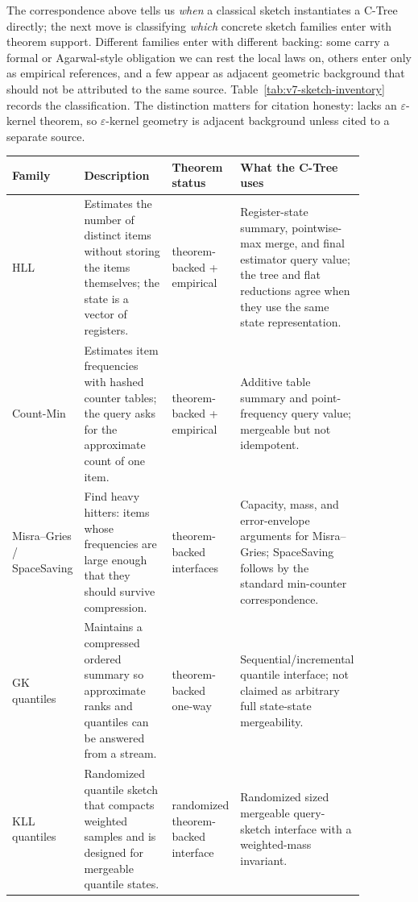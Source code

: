The correspondence above tells us \emph{when} a classical sketch
instantiates a C-Tree directly; the next move is classifying
\emph{which} concrete sketch families enter with theorem support. Different families enter with different
backing: some carry a formal or Agarwal-style obligation we can rest the
local laws on, others enter only as empirical references, and a few
appear as adjacent geometric background that should not be attributed
to the same source. Table~\ref{tab:v7-sketch-inventory} records the
classification. The distinction matters for citation honesty:
\citet{Agarwal2013MergeableTODS} lacks an \(\varepsilon\)-kernel
theorem, so \(\varepsilon\)-kernel geometry is adjacent background
unless cited to a separate source.

\begin{table}[t]
\centering
\scriptsize
\setlength{\tabcolsep}{3pt}
\begin{tabular}{@{}p{0.16\linewidth}p{0.26\linewidth}p{0.18\linewidth}p{0.27\linewidth}@{}}
\toprule
Family & Description & Theorem status & What the C-Tree uses \\
\midrule
HLL & Estimates the number of distinct items without storing the items
themselves; the state is a vector of registers. & theorem-backed + empirical & Register-state summary, pointwise-max merge, and final estimator query value; the tree and flat reductions agree when they use the same state representation. \\
Count-Min & Estimates item frequencies with hashed counter tables; the query
asks for the approximate count of one item. & theorem-backed + empirical & Additive table summary and point-frequency query value; mergeable but not idempotent. \\
Misra--Gries / SpaceSaving & Find heavy hitters: items whose frequencies are
large enough that they should survive compression. & theorem-backed interfaces & Capacity, mass, and error-envelope arguments for Misra--Gries; SpaceSaving follows by the standard min-counter correspondence. \\
GK quantiles & Maintains a compressed ordered summary so approximate ranks and
quantiles can be answered from a stream. & theorem-backed one-way & Sequential/incremental quantile interface; not claimed as arbitrary full state-state mergeability. \\
KLL quantiles & Randomized quantile sketch that compacts weighted samples and is
designed for mergeable quantile states. & randomized theorem-backed interface & Randomized sized mergeable query-sketch interface with a weighted-mass invariant. \\

\end{tabular}
\end{table}
